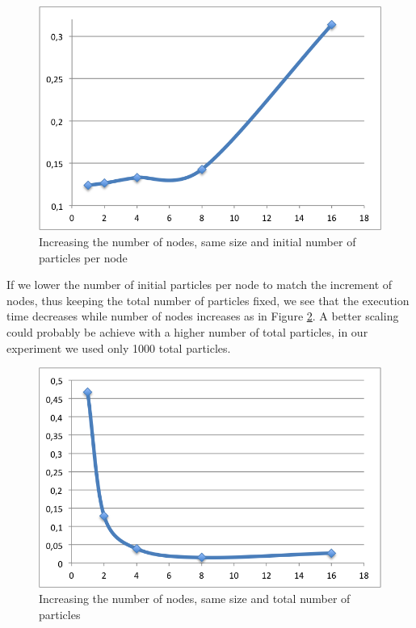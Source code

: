 \documentclass[a4paper]{article}
\begin{document}
\begin{figure}
  \centering
  \includegraphics{processor_scale.png}
  \caption{Increasing the number of nodes, same size and initial number of particles per node}
  \label{fig1}
\end{figure}

If we lower the number of initial particles per node to match the
increment of nodes, thus keeping the total number of particles fixed, we
see that the execution time decreases while number of nodes increases as in Figure \ref{fig0}. A
better scaling could probably be achieve with a higher number of total
particles, in our experiment we used only 1000 total particles.\\

\begin{figure}
  \centering
  \includegraphics{scale.png}
  \caption{Increasing the number of nodes, same size and total number of particles}
  \label{fig0}
\end{figure}
\end{document}

